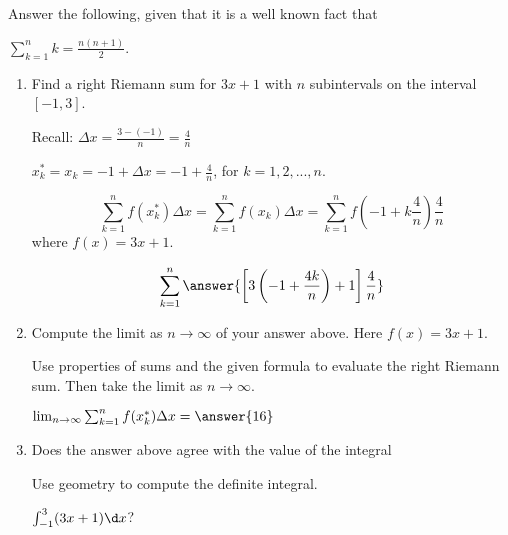 \documentclass{ximera}
\author{Gregory Hartman \and Matthew Carr\and Nela Lakos}
\begin{document}
\begin{exercise}


Answer the following, given that it is a well known fact that

$\sum_{k=1}^{n}k=\frac{n(n+1)}{2}$.
\begin{enumerate}
\item Find a right Riemann sum for $3x+1$ with $n$ subintervals on the interval $[-1,3]$.
\begin{hint}
Recall: $\Delta x=\frac{3-(-1)}{n}=\frac{4}{n}$

$x_k^*=x_k=-1+\Delta x=-1+\frac{4}{n}$, for $k=1,2,...,n.$
\end{hint}
\begin{hint}
\[
\sum_{k=1}^n f(x_k^*)\Delta x=\sum_{k=1}^n f(x_k)\Delta x=\sum_{k=1}^n f\left(-1+k\frac{4}{n}\right)\frac{4}{n}
\]
where $f(x)=3x+1$.
\end{hint}
\begin{prompt}
\[
\sum_{k=1}^n \answer{\left[3\left(-1+\frac{4k}{n}\right)+1\right]\frac{4}{n}}
\]
\end{prompt}

\item Compute the limit as $n\to\infty$ of your answer above. Here $f(x)=3x+1$.
\begin{hint}
Use properties of sums and the given formula to evaluate the right Riemann sum. Then take the limit as $n\to\infty$.
\end{hint}
\begin{prompt}

$\lim_{n\to\infty}\sum_{k=1}^n f(x_k^*)\Delta x= \answer{16}$

\end{prompt}
\item Does the answer above agree with the value of the integral
\begin{hint}
Use geometry to compute the definite integral.
\end{hint}
  $\int_{-1}^{3}(3x+1)\d x$? \begin{multipleChoice}
   
\end{multipleChoice}
\end{enumerate}
\end{exercise}
\end{document}
